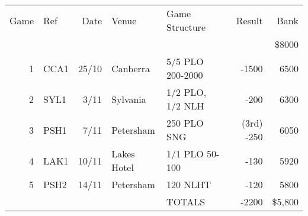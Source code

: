 \begin{tabular}{rlrllrr}
 Game & Ref & Date & Venue & Game Structure & Result & Bank \\
     &           &      &           &             &       & \$8000 \\
  1  &   CCA1    & 25/10 & Canberra & 5/5 PLO 200-2000 & -1500 & 6500 \\
  2  &   SYL1    &  3/11 & Sylvania & 1/2 PLO, 1/2 NLH &  -200 & 6300 \\
  3  &   PSH1    &  7/11 & Petersham & 250 PLO SNG & (3rd) -250 & 6050 \\
  4  &   LAK1    & 10/11 & Lakes Hotel & 1/1 PLO 50-100 &  -130 & 5920 \\
  5  &   PSH2    & 14/11 & Petersham & 120 NLHT & -120 & 5800 \\
     &           &       &           & TOTALS & -2200 & \$5,800 \\
\end{tabular}
